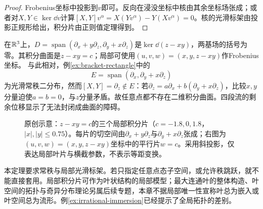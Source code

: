 \begin{proof}
Frobenius坐标中投影到$v$即可。反向在浸没坐标中核由其余坐标场张成；或者对$X,Y\in\ker\dd v$计算$[X,Y]v^\alpha=X(Yv^\alpha)-Y(Xv^\alpha)=0$。核的光滑标架由投影正规形给出，积分片由正则值定理得到。
\end{proof}
\begin{example}[可积与不可积的平面场]
在$\mathbb{R}^3$上，$D=\operatorname{span}(\partial_x+y\partial_z,\partial_y+x\partial_z)$是$\ker\dd(z-xy)$，两基场的括号为零。其积分曲面是$z-xy=c$；局部可使用$(u,v,w)=(x,y,z-xy)$作Frobenius坐标。
与此相对，例\ref{ex:bracket-rectangle}中的
\[
 E=\operatorname{span}(\partial_x,\partial_y+x\partial_z)
\]
为光滑常秩二分布，然而$[X,Y]=\partial_z\notin E$：若$\partial_z=a\partial_x+b(\partial_y+x\partial_z)$，比较$x,y$分量迫使$a=b=0$，与$z$分量矛盾。故任意点都不存在二维积分曲面。四段流的剩余位移显示了无法封闭成曲面的障碍。
\end{example}
\begin{figure}[htbp]
\centering
\caption{原创示意：$z-xy=c$的三个局部积分片（$c=-1.8,0,1.8$，$|x|,|y|\leq0.75$）。每片的切空间由$\partial_x+y\partial_z$与$\partial_y+x\partial_z$张成；右图为$(u,v,w)=(x,y,z-xy)$坐标中的平行片$w=c$。采用斜投影，仅表达局部叶片与横截参数，不表示等距变换。}
\label{fig:integral-plaques}
\end{figure}
本定理要求常秩与局部光滑标架。若只指定任意点态子空间，或允许秩跳跃，就不能直接套用。局部积分片可作为叶状结构的局部模型；最大连通叶的整体构造、叶空间的拓扑与奇异分布理论另属后续专题，本章不据局部唯一性宣称叶总为嵌入或叶空间总为流形。例\ref{ex:irrational-immersion}已经提示了全局拓扑的差别。
